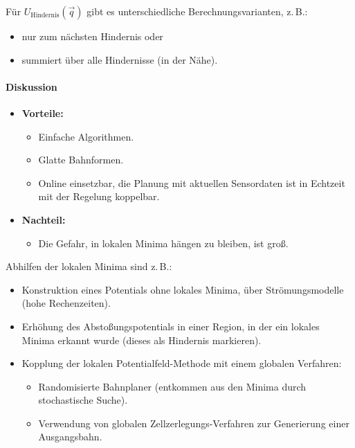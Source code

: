 				Für \( U_\text{Hindernis}(\vec{q}) \) gibt es unterschiedliche Berechnungsvarianten, z.\,B.:
				\begin{itemize}
					\item nur zum nächsten Hindernis oder
					\item summiert über alle Hindernisse (in der Nähe).
				\end{itemize}
			
			\paragraph{Diskussion}
				\begin{itemize}
					\item \textbf{Vorteile:}
						\begin{itemize}
							\item Einfache Algorithmen.
							\item Glatte Bahnformen.
							\item Online einsetzbar, \dh die Planung mit aktuellen Sensordaten ist in Echtzeit mit der Regelung koppelbar.
						\end{itemize}
					\item \textbf{Nachteil:}
						\begin{itemize}
							\item Die Gefahr, in lokalen Minima hängen zu bleiben, ist groß.
						\end{itemize}
				\end{itemize}
			
				Abhilfen \bzgl der lokalen Minima sind z.\,B.:
				\begin{itemize}
					\item Konstruktion eines Potentials ohne lokales Minima, \zB über Strömungsmodelle (hohe Rechenzeiten).
					\item Erhöhung des Abstoßungspotentials in einer Region, in der ein lokales Minima erkannt wurde (dieses als Hindernis markieren).
					\item Kopplung der lokalen Potentialfeld-Methode mit einem globalen Verfahren:
						\begin{itemize}
							\item Randomisierte Bahnplaner (entkommen aus den Minima durch stochastische Suche).
							\item Verwendung von globalen Zellzerlegungs-Verfahren zur Generierung einer Ausgangsbahn.
						\end{itemize}
				\end{itemize}


